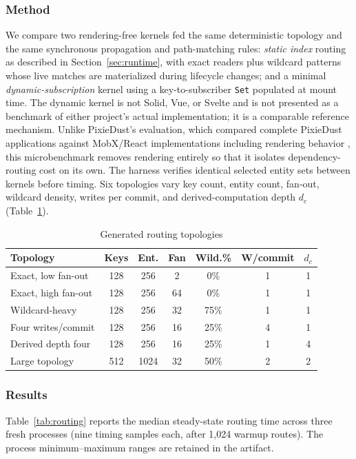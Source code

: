 \documentclass[conference]{IEEEtran}
\begin{document}
\subsubsection{Method}
We compare two rendering-free kernels fed the same deterministic topology
and the same synchronous propagation and path-matching rules: \emph{static
index} routing as described in Section~\ref{sec:runtime}, with exact readers
plus wildcard patterns whose live matches are materialized during lifecycle
changes; and a minimal \emph{dynamic-subscription} kernel using a
key-to-subscriber \texttt{Set} populated at mount time. The dynamic kernel is
not Solid, Vue, or Svelte and is not presented as a benchmark of either
project's actual implementation; it is a comparable reference mechanism.
Unlike PixieDust's evaluation, which compared complete PixieDust applications
against MobX/React implementations including rendering behavior
\cite{pixiedust}, this microbenchmark removes rendering entirely so that it
isolates dependency-routing cost on its own. The harness verifies identical
selected entity sets between kernels before timing. Six topologies vary key
count, entity count, fan-out, wildcard density, writes per commit, and
derived-computation depth $d_c$ (Table~\ref{tab:topologies}).

\begin{table}[h]
\centering
\caption{Generated routing topologies}
\label{tab:topologies}
\footnotesize
\begin{tabular}{@{}lcccccc@{}}
\toprule
\textbf{Topology} & Keys & Ent. & Fan & Wild.\% & W/commit & $d_c$ \\
\midrule
Exact, low fan-out & 128 & 256 & 2 & 0\% & 1 & 1 \\
Exact, high fan-out & 128 & 256 & 64 & 0\% & 1 & 1 \\
Wildcard-heavy & 128 & 256 & 32 & 75\% & 1 & 1 \\
Four writes/commit & 128 & 256 & 16 & 25\% & 4 & 1 \\
Derived depth four & 128 & 256 & 16 & 25\% & 1 & 4 \\
Large topology & 512 & 1024 & 32 & 50\% & 2 & 2 \\
\bottomrule
\end{tabular}
\end{table}

\subsubsection{Results}
\label{sec:microbench-results}
Table~\ref{tab:routing} reports the median steady-state routing time across
three fresh processes (nine timing samples each, after 1{,}024 warmup
routes). The process minimum--maximum ranges are retained in the artifact.
\end{document}
